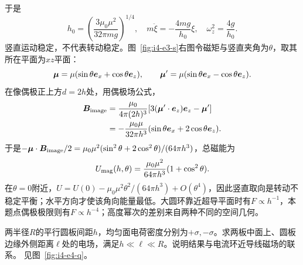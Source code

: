 \begin{solution}
于是
\[
\boxed{h_0=\left(\frac{3\mu_0\mu^2}{32\pi mg}\right)^{1/4}},
\quad m\ddot\xi=-\frac{4mg}{h_0}\xi,\quad
\boxed{\omega_z^2=\frac{4g}{h_0}}.
\]
竖直运动稳定，不代表转动稳定。图~\ref{fig:i4-e3-s}右图令磁矩与竖直夹角为$\theta$，取其所在平面为$xz$平面：
\[\bm{\mu}=\mu(\sin\theta\bm{e}_x+\cos\theta\bm{e}_z),\qquad
\bm{\mu}'=\mu(\sin\theta\bm{e}_x-\cos\theta\bm{e}_z).\]
在像偶极正上方$d=2h$处，用偶极场公式，
\[\begin{aligned}
\bm{B}_{\rm image}
&=\frac{\mu_0}{4\pi(2h)^3}[3(\bm{\mu}'\cdot\bm{e}_z)\bm{e}_z-\bm{\mu}']\\
&=-\frac{\mu_0\mu}{32\pi h^3}
(\sin\theta\bm{e}_x+2\cos\theta\bm{e}_z).
\end{aligned}\]
于是$-\bm{\mu}\cdot\bm{B}_{\rm image}/2
=\mu_0\mu^2(\sin^2\theta+2\cos^2\theta)/(64\pi h^3)$，总磁能为
\[
U_{\rm mag}(h,\theta)=\frac{\mu_0\mu^2}{64\pi h^3}(1+\cos^2\theta).
\]
在$\theta=0$附近，$U=U(0)-\mu_0\mu^2\theta^2/(64\pi h^3)+O(\theta^4)$，因此竖直取向是转动不稳定平衡；水平方向才使该角向能量最低。大圆环靠近超导平面时有$F\propto h^{-1}$，本题点偶极极限则有$F\propto h^{-4}$；高度幂次的差别来自两种不同的空间几何。
\end{solution}

\begin{example}[有限平行带电圆板的边缘场]\label{ex:i4-e4}

两半径$R$的平行圆板间距$h$，均匀面电荷密度分别为$+\sigma,-\sigma$。求两板中面上、圆板边缘外侧距离$\ell$处的电场，满足$h\ll\ell\ll R$。说明结果与电流环近导线磁场的联系。
 见图~\ref{fig:i4-e4-q}。
\end{example}

